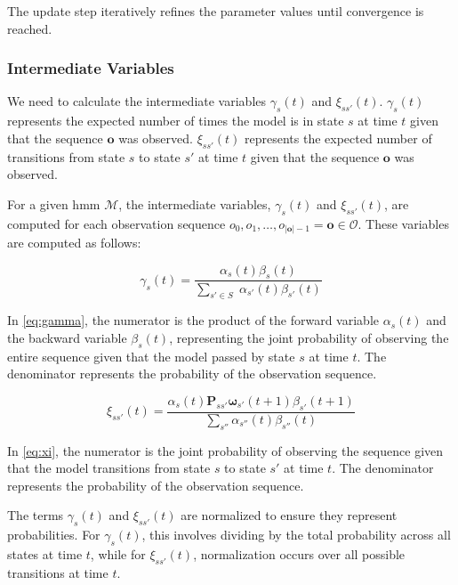 The update step iteratively refines the parameter values until convergence is reached.

\subsubsection{Intermediate Variables}
We need to calculate the intermediate variables $\gamma_s(t)$ and $\xi_{ss'}(t)$.
$\gamma_s(t)$ represents the expected number of times the model is in state $s$ at time $t$ given that the sequence $\mathbf{o}$ was observed.
$\xi_{ss'}(t)$ represents the expected number of transitions from state $s$ to state $s'$ at time $t$ given that the sequence $\mathbf{o}$ was observed.

For a given \gls{hmm} $\mathcal{M}$, the intermediate variables, $\gamma_s(t)$ and $\xi_{ss'}(t)$, are computed for each observation sequence $o_0, o_1, \dots, o_{|\mathbf{o}|-1} = \mathbf{o} \in \mathcal{O}$.
These variables are computed as follows:

\begin{equation}
    \gamma_s(t) = \frac{\alpha_s(t) \beta_s(t)}{\sum_{s' \in S} \;\alpha_{s'}(t) \beta_{s'}(t)}
    \label{eq:gamma}
\end{equation}

In \autoref{eq:gamma}, the numerator is the product of the forward variable $\alpha_s(t)$ and the backward variable $\beta_s(t)$, representing the joint probability of observing the entire sequence given that the model passed by state $s$ at time $t$.
The denominator represents the probability of the observation sequence.

\begin{equation}
    \xi_{ss'}(t) = \frac{\alpha_s(t) \pmb{P}_{ss'} \pmb{\omega}_{s'}(t + 1) \beta_{s'}(t + 1)}
    {\sum_{s''}\alpha_{s''}(t) \beta_{s''}(t)}
    \label{eq:xi}
\end{equation}


In \autoref{eq:xi}, the numerator is the joint probability of observing the sequence given that the model transitions from state $s$ to state $s'$ at time $t$.
The denominator represents the probability of the observation sequence.

The terms $\gamma_s(t)$ and $\xi_{ss'}(t)$ are normalized to ensure they represent probabilities.
For $\gamma_s(t)$, this involves dividing by the total probability across all states at time $t$, while for $\xi_{ss'}(t)$, normalization occurs over all possible transitions at time $t$.

